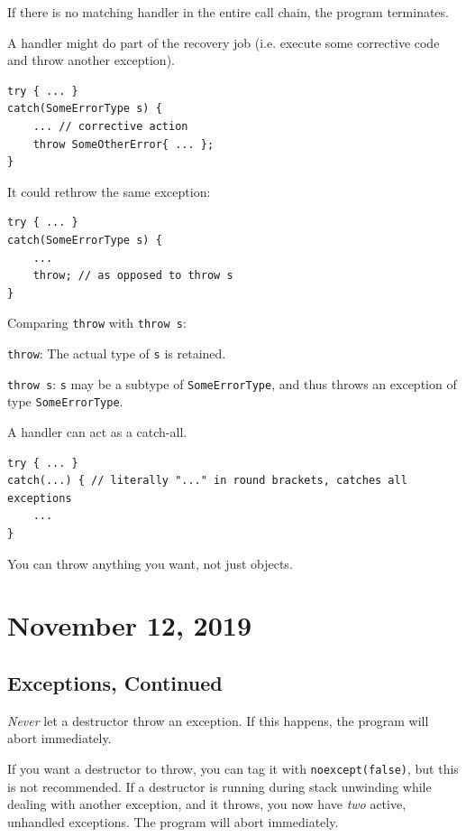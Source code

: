\documentclass[11pt]{article}
\theoremstyle{definition}
\begin{document}
If there is no matching handler in the entire call chain, the program terminates.

A handler might do part of the recovery job (i.e. execute some corrective code and throw another exception).
\begin{lstlisting}
try { ... }
catch(SomeErrorType s) {
    ... // corrective action
    throw SomeOtherError{ ... };
}
\end{lstlisting}
\vspace{-0.25cm}
It could rethrow the same exception:
\begin{lstlisting}
try { ... }
catch(SomeErrorType s) {
    ...
    throw; // as opposed to throw s
}
\end{lstlisting}
\vspace{-0.25cm}
Comparing {\tt throw} with {\tt throw s}:

{\tt throw}: The actual type of {\tt s} is retained.

{\tt throw s}: {\tt s} may be a subtype of {\tt SomeErrorType}, and thus throws an exception of type {\tt SomeErrorType}.

A handler can act as a catch-all. 
\begin{lstlisting}
try { ... }
catch(...) { // literally "..." in round brackets, catches all exceptions
    ...
}
\end{lstlisting}
\vspace{-0.25cm}
You can throw anything you want, not just objects.

\newpage
\section{November 12, 2019}

\subsection{Exceptions, Continued}
\emph{Never} let a destructor throw an exception. If this happens, the program will abort immediately. 

If you want a destructor to throw, you can tag it with {\tt noexcept(false)}, but this is not recommended. If a destructor is running during stack unwinding while dealing with another exception, and it throws, you now have \emph{two} active, unhandled exceptions. The program will abort immediately.
\end{document}
